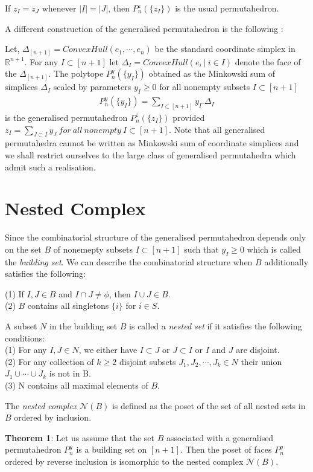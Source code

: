 \documentclass[hidelinks,12pt]{article}
\newcommand{\bea}[1]{\begin{eqnarray}\label{#1} }
\newcommand{\eea}{\end{eqnarray}}
\def\bea{\begin{eqnarray}}
\def\eea{\end{eqnarray}}
\begin{document}
 If $z_I =z_J$ whenever $|I| =|J|$, then  $ P_n^z(\{ z_I \})$ is the usual permutahedron.
 
 
 A different construction of the generalised permutahedron is the following :
 
 Let, $\Delta_{[n+1]} = ConvexHull(e_1,\cdots,e_n)$ be the standard coordinate simplex in $\mathbb{R}^{n+1}$. For any $I \subset [n+1] $ let $\Delta_I =ConvexHull(e_i~|~i\in I)$ denote the face of the $\Delta_{[n+1]}$. The polytope $P_n^y(\{y_I \})$ obtained as the Minkowski sum of simplices $\Delta_I$ scaled by  parameters $y_I \geq 0$ for all nonempty subsets $I \subset [n+1]$
 \bea
 P_n^y(\{y_I \})= \sum_{I \subset[n+1]} y_I . \Delta_I  \nonumber
 \eea
is the generalised permutahedron $P_n^z(\{z_I \})$  provided $z_I = \sum_{J \subset I} y_J  ~ for ~all~nonempty ~I \subset [n+1]$.
Note that all generalised permutahedra cannot be written as Minkowski sum of coordinate simplices and we shall restrict ourselves to the large class of generalised permutahedra which admit such a realisation.
\section*{Nested Complex}
Since the combinatorial structure of the generalised permutahedron depends only on the set $B$ of nonemepty subsets $I \subset [n+1]$ such that $y_I \geq 0$ which is called the {\it building set}. We can describe the combinatorial structure when $B$ additionally satisfies the following:

\noindent(1) If $I,J \in B$ and $I \cap J \neq \phi $, then $I \cup J \in B$. \\
(2) $B$ contains all singletons $\{ i\}$ for $i \in S$.

A subset $N$ in the building set $B$ is called a {\it nested set} if it satisfies the following conditions:\\
\noindent
(1) For any $I,J \in N$, we either have $I \subset J$ or $J\subset I$ or $I$ and $J$ are disjoint.\\
(2) For any collection of $k \geq 2$ disjoint subsets $J_1,J_2,\cdots, J_k \in N$ their union $J_1 \cup \cdots \cup J_k$ is not in B. \\
(3) N contains all maximal elements of $B$.

The {\it nested complex} $\mathcal{N}(B)$ is defined as the poset of the set of all nested sets in $B$ ordered by inclusion.

{\bf Theorem 1}: Let us assume that the set $B$ associated with a generalised permutahedron $P_n^{y}$ is a building set on $[n+1]$. Then the poset of faces $P_n^{y}$ ordered by reverse inclusion is isomorphic to the nested complex $\mathcal{N}(B)$. 
\end{document}
